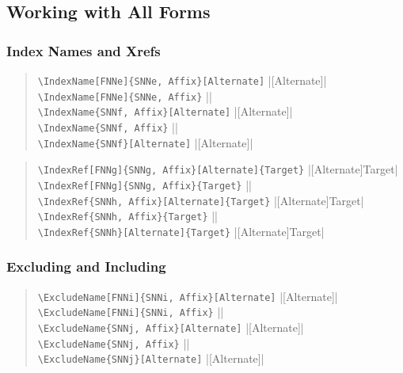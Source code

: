 \documentclass[oneside]{article}
\begin{document}
\subsection{Working with All Forms}

\subsubsection{Index Names and Xrefs}

\begin{quote}
\Verb+\IndexName[FNNe]{SNNe, Affix}[Alternate]+\dotfill
  |[Alternate]|\\
\Verb+\IndexName[FNNe]{SNNe, Affix}+\dotfill
  ||\\
\Verb+\IndexName{SNNf, Affix}[Alternate]+\dotfill
  |[Alternate]|\\
\Verb+\IndexName{SNNf, Affix}+\dotfill
  ||\\
\Verb+\IndexName{SNNf}[Alternate]+\dotfill
  |[Alternate]|
\end{quote}

\begin{quote}
\Verb+\IndexRef[FNNg]{SNNg, Affix}[Alternate]{Target}+\dotfill
  |[Alternate]{Target}|\\
\Verb+\IndexRef[FNNg]{SNNg, Affix}{Target}+\dotfill
  ||\\
\Verb+\IndexRef{SNNh, Affix}[Alternate]{Target}+\dotfill
  |[Alternate]{Target}|\\
\Verb+\IndexRef{SNNh, Affix}{Target}+\dotfill
  ||\\
\Verb+\IndexRef{SNNh}[Alternate]{Target}+\dotfill
  |[Alternate]{Target}|
\end{quote}

\subsubsection{Excluding and Including}

\begin{quote}
\Verb+\ExcludeName[FNNi]{SNNi, Affix}[Alternate]+\dotfill
  |[Alternate]|\\
\Verb+\ExcludeName[FNNi]{SNNi, Affix}+\dotfill
  ||\\
\Verb+\ExcludeName{SNNj, Affix}[Alternate]+\dotfill
  |[Alternate]|\\
\Verb+\ExcludeName{SNNj, Affix}+\dotfill
  ||\\
\Verb+\ExcludeName{SNNj}[Alternate]+\dotfill
  |[Alternate]|
\end{quote}
\end{document}
